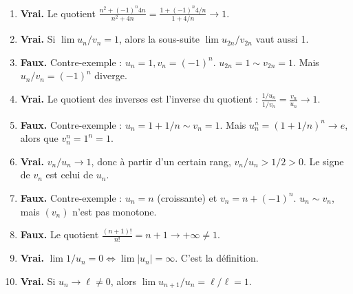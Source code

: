 \documentclass[solutions]{exercices}
\begin{document}
\begin{solution}
	\begin{enumerate}
		\item \textbf{Vrai.} Le quotient $\frac{n^2+(-1)^n 4n}{n^2+4n} = \frac{1+(-1)^n 4/n}{1+4/n} \to 1$.
		\item \textbf{Vrai.} Si $\lim u_n/v_n = 1$, alors la sous-suite $\lim u_{2n}/v_{2n}$ vaut aussi 1.
		\item \textbf{Faux.} Contre-exemple : $u_n=1, v_n=(-1)^n$. $u_{2n}=1 \sim v_{2n}=1$. Mais $u_n/v_n = (-1)^n$ diverge.
		\item \textbf{Vrai.} Le quotient des inverses est l'inverse du quotient : $\frac{1/u_n}{1/v_n} = \frac{v_n}{u_n} \to 1$.
		\item \textbf{Faux.} Contre-exemple : $u_n=1+1/n \sim v_n=1$. Mais $u_n^n = (1+1/n)^n \to e$, alors que $v_n^n=1^n=1$.
		\item \textbf{Vrai.} $v_n/u_n \to 1$, donc à partir d'un certain rang, $v_n/u_n > 1/2 > 0$. Le signe de $v_n$ est celui de $u_n$.
		\item \textbf{Faux.} Contre-exemple : $u_n=n$ (croissante) et $v_n=n+(-1)^n$. $u_n \sim v_n$, mais $(v_n)$ n'est pas monotone.
		\item \textbf{Faux.} Le quotient $\frac{(n+1)!}{n!} = n+1 \to +\infty \ne 1$.
		\item \textbf{Vrai.} $\lim 1/u_n = 0 \iff \lim |u_n|=\infty$. C'est la définition.
		\item \textbf{Vrai.} Si $u_n \to \ell \ne 0$, alors $\lim u_{n+1}/u_n = \ell/\ell = 1$.
	\end{enumerate}
\end{solution}
\end{document}
